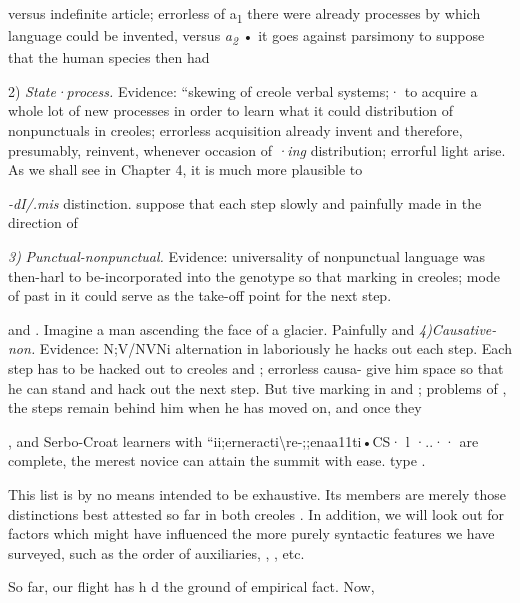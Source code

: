 versus indefinite article; errorless  of a\textsubscript{1 }there were already processes by which language could be invented, versus \textit{a}\textit{\textsubscript{2}}\textsubscript{ }• it goes against parsimony to suppose that the human species then had

2) \textit{State}\textit{·}\textit{process.} Evidence: ``skewing of creole verbal systems;· to acquire a whole lot of new processes in order to learn what it could distribution of nonpunctuals in creoles; errorless acquisition already invent and therefore, presumably, reinvent, whenever occasion of  \textit{·}\textit{ing }distribution; errorful   l{\textquotedbl}ight arise. As we shall see in Chapter 4, it is much more plausible to

\textit{{}-dI/.mis} distinction. suppose that each step slowly and painfully made in the direction of

\textit{3}\textit{)} \textit{Punctual-nonpunctual. }Evidence: universality of nonpunctual language was then-harl to be-incorporated into the genotype so that marking in creoles; mode of  past  in it could serve as the take-off point for the next step.

 and . Imagine a man ascending the face of a glacier. Painfully and \textit{4)Causative-non. }Evidence: N;V/NVNi alternation in laboriously he hacks out each step. Each step has to be hacked out to creoles and ; errorless  causa- give him space so that he can stand and hack out the next step. But tive marking in  and ; problems of , the steps remain behind him when he has moved on, and once they

, and Serbo-Croat learners with ``ii;erneracti{\textbackslash}re-;;enaa11ti•CS· l ·..·· are complete, the merest novice can attain the summit with ease. type .

This list is by no means intended to be exhaustive. Its members are merely those distinctions best attested so far in both creoles . In addition, we will look out for factors which might have influenced the more purely syntactic features we have surveyed, such as the order of auxiliaries,  , , etc.

So far, our flight has h d the ground of empirical fact. Now,

